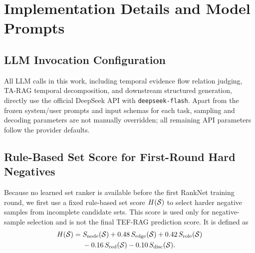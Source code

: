 \section{Implementation Details and Model Prompts}
\label{app:implementation}

\subsection{LLM Invocation Configuration}
\label{app:llm_config}

All LLM calls in this work, including temporal evidence flow relation judging,
TA-RAG temporal decomposition, and downstream structured generation, directly use the official DeepSeek API with \texttt{deepseek-flash}.
Apart from the frozen system/user prompts and input schemas for each task,
sampling and decoding parameters are not manually overridden; all remaining API parameters follow the provider defaults.


\subsection{Rule-Based Set Score for First-Round Hard Negatives}
\label{app:hand_score}

Because no learned set ranker is available before the first RankNet training round, we first use a fixed rule-based set score
$H(\mathcal{S})$ to select harder negative samples from incomplete candidate sets. This score is used only for negative-sample selection and is not the final TEF-RAG prediction score. It is defined as
\begin{equation}
\begin{aligned}
H(\mathcal{S})
={}&S_{\mathrm{node}}(\mathcal{S})
+0.48\,S_{\mathrm{edge}}(\mathcal{S})
+0.42\,S_{\mathrm{role}}(\mathcal{S})\\
&-0.16\,S_{\mathrm{red}}(\mathcal{S})
-0.10\,S_{\mathrm{disc}}(\mathcal{S}).
\end{aligned}
\label{eq:appendix_hand_score}
\end{equation}

